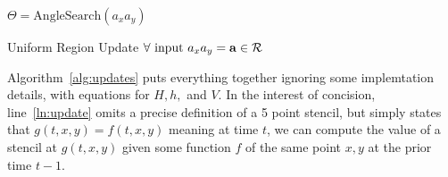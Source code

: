 
\begin{algorithm}[h]
  \setcounter{AlgoLine}{0}
  $\Theta = \text{AngleSearch}(a_xa_y)$\; \label{ln:as}

  \caption{Uniform Region Update $\forall \text{ input } a_xa_y = \mathbf{a} \in \mathcal{R}$}
  \label{alg:updates}
\end{algorithm}

Algorithm~\ref{alg:updates} puts everything together ignoring some implemtation details,
with equations for $H,h,$ and $V$.
In the interest of concision, line~\ref{ln:update} omits a precise definition of a 5
point stencil, but simply states that $g(t,x,y) = f(t,x,y)$ meaning at time
$t$, we can compute the value of a stencil at $g(t,x,y)$ given some function $f$
of the same point $x,y$ at the prior time $t-1$.



